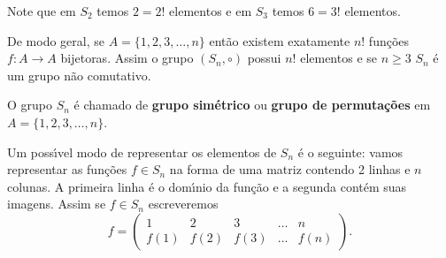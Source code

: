 Note que em $S_2$ temos $2 = 2!$ elementos e em $S_3$ temos $6 = 3!$ elementos.

De modo geral, se $A = \{1, 2, 3, \dots, n\}$ ent\~ao existem exatamente $n!$ fun\c{c}\~oes $f : A \to A$ bijetoras. Assim o grupo $(S_n, \circ)$ possui $n!$ elementos e se $n \geqslant 3$ $S_n$ \'e um grupo n\~ao comutativo.

\begin{definicao}
	O grupo $S_n$ \'e chamado de \textbf{grupo sim\'etrico} ou \textbf{grupo de permuta\c{c}\~oes} em $A = \{1, 2, 3, \dots, n\}$.
\end{definicao}


Um poss{\'\i}vel modo de representar os elementos de $S_n$ \'e o seguinte: vamos representar as fun\c{c}\~oes $f \in S_n$ na forma de uma matriz contendo 2 linhas e $n$ colunas. A primeira linha \'e o dom{\'\i}nio da fun\c{c}\~ao e a segunda cont\'em suas imagens. Assim se $f \in S_n$ escreveremos
\[
	f = \begin{pmatrix}
		1 & 2 & 3 & \dots & n\\
		f(1) & f(2) & f(3) & \dots & f(n)
	\end{pmatrix}.
\]

